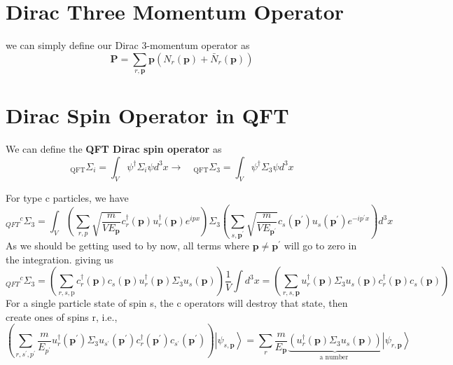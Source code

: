\section{Dirac Three Momentum Operator}
we can simply define our Dirac 3-momentum operator as
\begin{equation}
\mathbf{P}=\sum_{r, \mathbf{p}} \mathbf{p}\left(N_{r}(\mathbf{p})+\bar{N}_{r}(\mathbf{p})\right)
\end{equation}
\section{Dirac Spin Operator in QFT}
\begin{qt}
We can define the \textbf{QFT Dirac spin operator} as
\begin{equation}
{}_\mathrm{QFT}{\Sigma_{i}}=\int_{V} \psi^{\dagger} \Sigma_{i} \psi d^{3} x \rightarrow \quad {}_\mathrm{QFT}{\Sigma_{3}}=\int_{V} \psi^{\dagger} \Sigma_{3} \psi d^{3} x
\end{equation}
\end{qt} 
For type c particles, we have
\begin{equation}
{}_{ QFT }{}^{c} \Sigma_{3}=\int_{V}\left(\sum_{r, p} \sqrt{\frac{m}{V E_{\mathbf{p}}}} c_{r}^{\dagger}(\mathbf{p}) u_{r}^{\dagger}(\mathbf{p}) e^{i p x}\right) \Sigma_{3}\left(\sum_{s, \mathbf{p}^{\prime}} \sqrt{\frac{m}{V E_{\mathbf{p}^{\prime}}}} c_{s}\left(\mathbf{p}^{\prime}\right) u_{s}\left(\mathbf{p}^{\prime}\right) e^{-i p^{\prime} x}\right) d^{3} x
\end{equation}
As we should be getting used to by now, all terms where $\mathbf{p} \neq \mathbf{p}^{\prime}$ will go to zero in the integration. giving us
\begin{equation}
{}_{ QFT }{}^{c} \Sigma_{3}=\left(\sum_{r, s, \mathrm{p}} c_{r}^{\dagger}(\mathbf{p}) c_{s}(\mathbf{p}) u_{r}^{\dagger}(\mathbf{p}) \Sigma_{3} u_{s}(\mathbf{p})\right) \frac{1}{V} \int d^{3} x=\left(\sum_{r, s, \mathbf{p}} u_{r}^{\dagger}(\mathbf{p}) \Sigma_{3} u_{s}(\mathbf{p}) c_{r}^{\dagger}(\mathbf{p}) c_{s}(\mathbf{p})\right)
\end{equation}
For a single particle state of spin s, the c operators will destroy that state, then create ones of spins r, i.e.,
\begin{equation}
\left(\sum_{r, s^{\prime}, p^{\prime}} \frac{m}{E_{p^{\prime}}} u_{r}^{\dagger}\left(\mathbf{p}^{\prime}\right) \Sigma_{3} u_{s^{\prime}}\left(\mathbf{p}^{\prime}\right) c_{r}^{\dagger}\left(\mathbf{p}^{\prime}\right) c_{s^{\prime}}\left(\mathbf{p}^{\prime}\right)\right) \left| \psi_{s, \mathbf{p}}\right\rangle=\sum_{r} \frac{m}{E_{\mathbf{p}}} \underbrace{\left(u_{r}^{\dagger}(\mathbf{p}) \Sigma_{3} u_{s}(\mathbf{p})\right)}_{\text {a number }}\left|\psi_{r, \mathbf{p}}\right\rangle
\end{equation}
